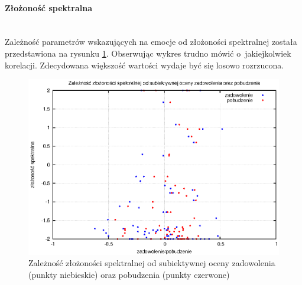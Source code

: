 \paragraph{Złożoność spektralna}\mbox{}\\
Zależność parametrów wskazujących na emocje od złożoności spektralnej została przedstawiona na rysunku \ref{wykresComplexity}. Obserwując wykres trudno mówić o~jakiejkolwiek korelacji. Zdecydowana większość wartości wydaje być się losowo rozrzucona.
\begin{figure}[ht!]
\centering
\includegraphics[scale=\imageSize]{res/complexity.eps}
\caption{Zależność złożoności spektralnej od subiektywnej oceny zadowolenia (punkty niebieskie) oraz pobudzenia (punkty czerwone)\label{wykresComplexity}}
\end{figure}


